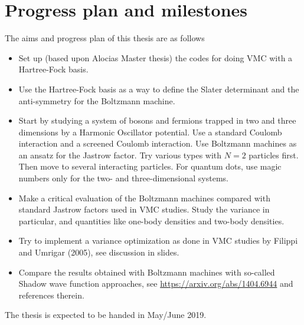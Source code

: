 \documentclass[10pt]{article}
\begin{document}
\section*{Progress plan and milestones}
The aims and progress plan of this thesis are as follows
\begin{itemize}
\item Set up (based upon Alocias Master thesis) the codes for doing VMC with a Hartree-Fock basis.
\item Use the Hartree-Fock basis as a way to define the Slater determinant and the anti-symmetry for the Boltzmann machine.
\item  Start by studying a system of bosons and fermions trapped in two and three dimensions by a Harmonic Oscillator potential. Use a standard Coulomb interaction and a screened Coulomb interaction. Use Boltzmann machines as an ansatz for the Jastrow factor. Try various types with $N=2$ particles first. Then move to several interacting particles. For quantum dots, use magic numbers only for the two- and three-dimensional systems. 
\item Make a critical evaluation of the Boltzmann machines compared with standard Jastrow factors used in VMC studies. Study the variance in particular, and quantities like one-body densities and two-body densities. 
\item Try to implement a variance optimization as done in VMC studies by Filippi and Umrigar (2005), see discussion in slides. 
\item Compare the results obtained with Boltzmann machines with so-called Shadow wave function approaches, see \url{https://arxiv.org/abs/1404.6944} and references therein.
\end{itemize}
 
The thesis is expected to be handed in May/June 2019.
\end{document}
